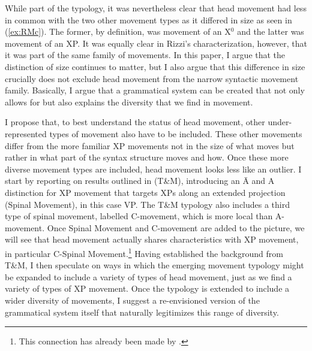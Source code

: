 \documentclass[output=paper,colorlinks,citecolor=brown,
]{langscibook}
\begin{document}
\noindent 
While part of the typology, it was nevertheless clear that head movement had less in common with the two other movement types as it differed in size as seen in (\ref{ex:RMc}). The former, by definition, was movement of an X$^0$ and the latter was movement of an XP.  It was equally clear in Rizzi's characterization, however, that it was part of the same family of movements.  In this paper, I argue that the distinction of size continues to matter, but I also argue that this difference in size crucially does  not exclude head movement from the narrow syntactic movement family.  Basically, I argue that a grammatical system can be created that not only allows for but also explains the diversity that we find in movement.

I propose that, to best understand the status of head movement, other under-represented types of movement also have to be included.  These other movements differ from the more familiar XP movements not in the size of what moves but rather in what part of the syntax structure moves and how.  Once these more diverse movement types are included, head movement looks less like an outlier.  I start by reporting on results outlined in \citet{Travis:2021} (T\&M), introducing an \=A and A distinction for XP movement that targets XPs along an extended projection (Spinal Movement), in this case VP.  The T\&M typology also includes a third type of spinal movement, labelled C-movement, which is more local than A-movement.   Once Spinal Movement and C-movement are added to the picture, we will see that head movement actually shares characteristics with XP movement, in particular C-Spinal Movement.\footnote{This connection has already been made by \citet{Pearson:2000}.}  Having established the background from T\&M, I then speculate on ways in which the emerging movement typology might be expanded to include a variety of types of head movement, just as we find a variety of types of XP movement.  Once the typology is extended to include a wider diversity of movements, I suggest a re-envisioned version of the grammatical system itself that naturally legitimizes this range of diversity.
 
\end{document}
